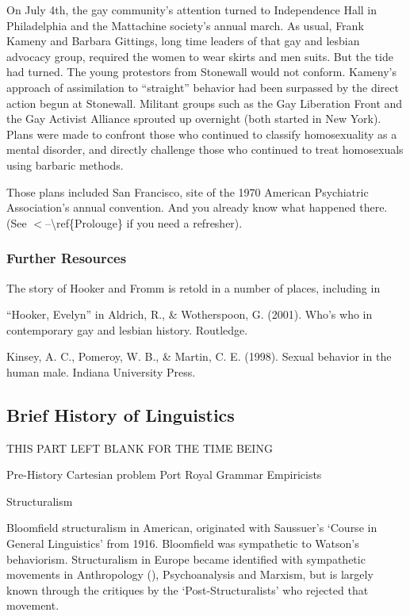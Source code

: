 On July 4th, the gay community’s attention turned to Independence Hall in Philadelphia and the Mattachine society’s annual march. As usual, Frank Kameny and Barbara Gittings, long time leaders of that gay and lesbian advocacy group, required the women to wear skirts and men suits. But the tide had turned. The young protestors from Stonewall would not conform. Kameny’s approach of assimilation to “straight” behavior had been surpassed by the direct action begun at Stonewall. Militant groups such as the Gay Liberation Front and the Gay Activist Alliance sprouted up overnight (both started in New York). Plans were made to confront those who continued to classify homosexuality as a mental disorder, and directly challenge those who continued to treat homosexuals using barbaric methods.

Those plans included San Francisco, site of the 1970 American Psychiatric Association’s annual convention. And you already know what happened there. (See $<$--\textbackslash{}ref\{Prolouge\} if you need a refresher).

\subsubsection{Further Resources}
\label{furtherresources}

The story of Hooker and Fromm is retold in a number of places, including in

“Hooker, Evelyn” in Aldrich, R., \& Wotherspoon, G. (2001). Who's who in contemporary gay and lesbian history. Routledge.

Kinsey, A. C., Pomeroy, W. B., \& Martin, C. E. (1998). Sexual behavior in the human male. Indiana University Press.

\subsection{Brief History of Linguistics}
\label{briefhistoryoflinguistics}

THIS PART LEFT BLANK FOR THE TIME BEING

Pre-History
Cartesian problem
Port Royal Grammar
Empiricists

Structuralism

Bloomfield structuralism in American, originated with Saussuer's `Course in General Linguistics' from 1916. Bloomfield was sympathetic to Watson's behaviorism. Structuralism in Europe became identified with sympathetic movements in Anthropology (), Psychoanalysis and Marxism, but is largely known through the critiques by the `Post-Structuralists' who rejected that movement.


